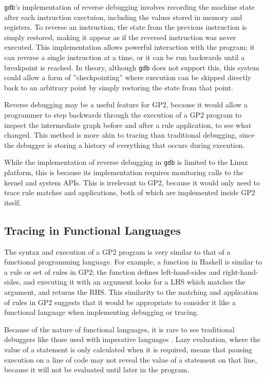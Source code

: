 \documentclass[authoryearcitations]{UoYCSproject}
\begin{document}
\texttt{gdb}'s implementation of reverse debugging involves recording the machine
state after each instruction exectuion, including the values stored in memory and
registers. To reverse an instruction, the state from the previous instruction is
simply restored, making it appear as if the reversed instruction was never
executed. This implementation allows powerful interaction with the program; it
can reverse a single instruction at a time, or it can be run backwards until a
breakpoint is reached. In theory, although \texttt{gdb} does not support this,
this system could allow a form of ''checkpointing'' where execution can be skipped
directly back to an arbitrary point by simply restoring the state from that point.

Reverse debugging may be a useful feature for GP2, because it would allow a
programmer to step backwards through the execution of a GP2 program to inspect
the intermediate graph before and after a rule application, to see what changed.
This method is more akin to tracing than traditional debugging, since the debugger
is storing a history of everything that occurs during execution.

While the implementation of reverse debugging in \texttt{gdb} is limited to the
Linux platform, this is because its implementation requires monitoring calls to
the kernel and system APIs. This is irrelevant to GP2, because it would only
need to trace rule matches and applications, both of which are implemented inside
GP2 itself.


\subsection{Tracing in Functional Languages}
\label{sec:TracingInFunctionalLanguages}

The syntax and execution of a GP2 program is very similar to that of a functional
programming language. For example, a function in Haskell is similar to a rule or
set of rules in GP2; the function defines left-hand-sides and right-hand-sides,
and executing it with an argument looks for a LHS which matches the argument,
and returns the RHS. This similarity to the matching and application of rules in
GP2 suggests that it would be appropriate to consider it like a functional
language when implementing debugging or tracing.

Because of the nature of functional languages, it is rare to see traditional
debuggers like those used with imperative languages \citep{wadler1998}. Lazy
evaluation, where the value of a statement is only calculated when it is required,
means that pausing execution on a line of code may not reveal the value of a
statement on that line, because it will not be evaluated until later in the program.
\end{document}
